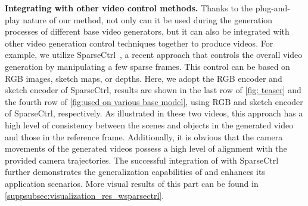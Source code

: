 \noindent \textbf{Integrating \method with other video control methods.}
Thanks to the plug-and-play nature of our method, not only can it be used during the generation processes of different base video generators, but it can also be integrated with other video generation control techniques together to produce videos. 
%
For example, we utilize SparseCtrl~\citep{sparsectrl}, a recent approach that controls the overall video generation by manipulating a few sparse frames.
%
This control can be based on RGB images, sketch maps, or depths.
%
Here, we adopt the RGB encoder and sketch encoder of SparseCtrl, results are shown in the last row of \cref{fig: teaser} and the fourth row of \cref{fig:used on various base model}, using RGB and sketch encoder of SparseCtrl, respectively.
%
As illustrated in these two videos, this approach has a high level of consistency between the scenes and objects in the generated video and those in the reference frame.
%
Additionally, it is obvious that the camera movements of the generated videos possess a high level of alignment with the provided camera trajectories.
%
The successful integration of \method with SparseCtrl further demonstrates the generalization capabilities of \method and enhances its application scenarios.
%
More visual results of this part can be found in \cref{suppsubsec:visualization_res_wsparsectrl}.
